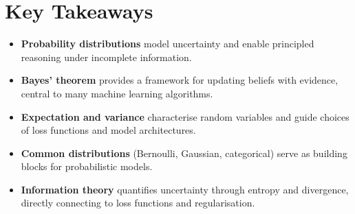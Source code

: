 
\section*{Key Takeaways}

\begin{keytakeaways}
\begin{itemize}[leftmargin=2em]
    \item \textbf{Probability distributions} model uncertainty and enable principled reasoning under incomplete information.
    \item \textbf{Bayes' theorem} provides a framework for updating beliefs with evidence, central to many machine learning algorithms.
    \item \textbf{Expectation and variance} characterise random variables and guide choices of loss functions and model architectures.
    \item \textbf{Common distributions} (Bernoulli, Gaussian, categorical) serve as building blocks for probabilistic models.
    \item \textbf{Information theory} quantifies uncertainty through entropy and divergence, directly connecting to loss functions and regularisation.
\end{itemize}
\end{keytakeaways}


